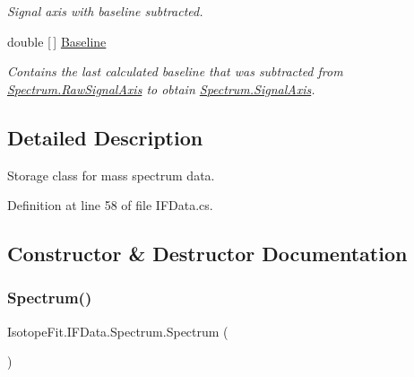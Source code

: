 \begin{DoxyCompactItemize}
\begin{DoxyCompactList}\small\item\em Signal axis with baseline subtracted. \end{DoxyCompactList}\item 
double \mbox{[}$\,$\mbox{]} \hyperlink{class_isotope_fit_1_1_i_f_data_1_1_spectrum_a67e318d42b4eb69b14dd05238a670f79}{Baseline}
\begin{DoxyCompactList}\small\item\em Contains the last calculated baseline that was subtracted from \hyperlink{class_isotope_fit_1_1_i_f_data_1_1_spectrum_a948927d795db6a73eb1ddeac4f294cac}{Spectrum.\+Raw\+Signal\+Axis} to obtain \hyperlink{class_isotope_fit_1_1_i_f_data_1_1_spectrum_a561e2e683aee78aed97a967a68b474e9}{Spectrum.\+Signal\+Axis}. \end{DoxyCompactList}\end{DoxyCompactItemize}


\subsection{Detailed Description}
Storage class for mass spectrum data. 



Definition at line 58 of file I\+F\+Data.\+cs.



\subsection{Constructor \& Destructor Documentation}
\mbox{\label{class_isotope_fit_1_1_i_f_data_1_1_spectrum_a57f4b9355944433a34eb668f22bb1f17}} 
\subsubsection{\texorpdfstring{Spectrum()}{Spectrum()}\hspace{0.1cm}{\footnotesize\ttfamily [1/2]}}
{\footnotesize\ttfamily Isotope\+Fit.\+I\+F\+Data.\+Spectrum.\+Spectrum (\begin{DoxyParamCaption}{ }\end{DoxyParamCaption})}



